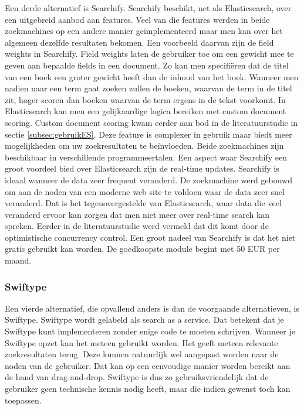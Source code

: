 Een derde alternatief is Searchify. Searchify beschikt, net als Elasticsearch, over een uitgebreid aanbod aan features. Veel van die features werden in beide zoekmachines op een andere manier geïmplementeerd maar men kan over het algemeen dezelfde resultaten bekomen. Een voorbeeld daarvan zijn de field weights in Searchify. Field weights laten de gebruiker toe om een gewicht mee te geven aan bepaalde fields in een document. Zo kan men specifiëren dat de titel van een boek een groter gewicht heeft dan de inhoud van het boek. Wanneer men nadien naar een term gaat zoeken zullen de boeken, waarvan de term in de titel zit, hoger scoren dan boeken waarvan de  term ergens in de tekst voorkomt. In Elasticsearch kan men een gelijkaardige logica bereiken met custom document scoring. Custom document scoring kwam eerder aan bod in de literatuurstudie in sectie \ref{subsec:gebruikES}. Deze feature is complexer in gebruik maar biedt meer mogelijkheden om uw zoekresultaten te beïnvloeden. Beide zoekmachines zijn beschikbaar in verschillende programmeertalen. Een aspect waar Searchify een groot voordeel bied over Elasticsearch zijn de real-time updates. Searchify is ideaal wanneer de data zeer frequent veranderd. De zoekmachine werd gebouwd om aan de noden van een moderne web site te voldoen waar de data zeer snel veranderd. Dat is het tegenovergestelde van Elasticsearch, waar data die veel veranderd ervoor kan zorgen dat men niet meer over real-time search kan spreken. Eerder in de literatuurstudie werd vermeld dat dit komt door de optimistische concurrency control. Een groot nadeel van Searchify is dat het niet gratis gebruikt kan worden. De goedkoopste module begint met 50 EUR per maand.

\subsubsection{Swiftype}

Een vierde alternatief, die opvallend anders is dan de voorgaande alternatieven, is Swiftype. Swiftype wordt gelabeld als search as a service. Dat betekent dat je Swiftype kunt implementeren zonder enige code te moeten schrijven. Wanneer je Swiftype opzet kan het meteen gebruikt worden. Het geeft meteen relevante zoekresultaten terug. Deze kunnen natuurlijk wel aangepast worden naar de noden van de gebruiker. Dat kan op een eenvoudige manier worden bereikt aan de hand van drag-and-drop. Swiftype is dus zo gebruiksvriendelijk dat de gebruiker geen technische kennis nodig heeft, maar die indien gewenst toch kan toepassen.

